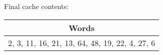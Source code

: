 \documentclass{article}
\begin{document}
\begin{enumerate}
Final cache contents:
\begin{tabular}{|c|}
\hline
Words \\
\hline
2, 3, 11, 16, 21, 13, 64, 48, 19, 22, 4, 27, 6 \\
\hline
\end{tabular}

\end{enumerate}
\end{document}
